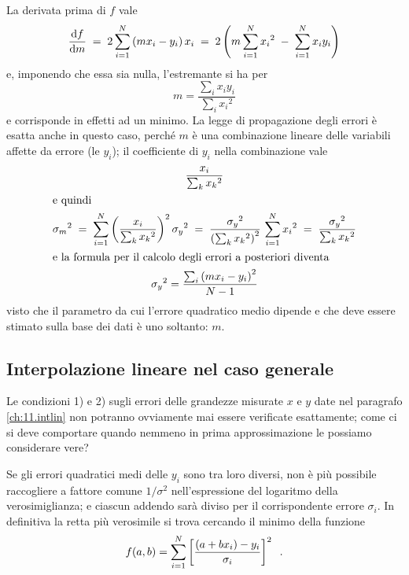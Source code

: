 La derivata prima di $f$ vale
\begin{equation*}
  \frac{\mathrm{d} f}{\mathrm{d} m} \; = \;
  2 \sum_{i=1}^N \left( m x_i - y_i \right) x_i
  \; = \; 2 \left( m \sum_{i=1}^N {x_i}^2 \; - \;
    \sum_{i=1}^N x_i y_i \right)
\end{equation*}
e, imponendo che essa sia nulla, l'estremante si ha per
\begin{equation*}
  m = \frac{\sum_i x_i y_i}{\sum_i {x_i}^2}
\end{equation*}
e corrisponde in effetti ad un minimo.  La legge di
propagazione degli errori \`e esatta anche in questo caso,
perch\'e $m$ \`e una combinazione lineare delle variabili
affette da errore (le $y_i$); il coefficiente di $y_i$ nella
combinazione vale
\begin{gather*}
  \frac{x_i}{\sum_k {x_k}^2} \\
  \intertext{e quindi}
  {\sigma_m}^2 \; = \; \sum_{i=1}^N \left(
    \frac{x_i}{\sum_k {x_k}^2} \right)^2
    {\sigma_y}^2 \; = \; \frac{{\sigma_y}^2}{
    \left( \sum_k {x_k}^2 \right)^2 } \,
    \sum_{i=1}^N {x_i}^2 \; = \; \frac{{\sigma_y}^2}
    {\sum_k {x_k}^2} \\
  \intertext{e la formula per il calcolo degli
    errori a posteriori diventa}%
  \index{errore!a posteriori}
  {\sigma_y}^2 = \frac{\sum_i \left( m x_i - y_i \right)
    ^2}{N-1}
\end{gather*}
visto che il parametro da cui l'errore quadratico medio
dipende e che deve essere stimato sulla base dei dati \`e
uno soltanto: $m$.%

\subsection{Interpolazione lineare nel caso generale}%
Le condizioni 1) e 2) sugli errori delle grandezze misurate
$x$ e $y$ date nel paragrafo \ref{ch:11.intlin} non potranno
ovviamente mai essere verificate esattamente; come ci si
deve comportare quando nemmeno in prima approssimazione le
possiamo considerare vere?

Se gli errori quadratici medi delle $y_i$ sono tra loro
diversi, non \`e pi\`u possibile raccogliere a fattore
comune $1 / \sigma^2$ nell'espressione del logaritmo della
verosimiglianza; e ciascun addendo sar\`a diviso per il
corrispondente errore $\sigma_i$.  In definitiva la retta
pi\`u verosimile si trova cercando il minimo della funzione
\begin{equation*}
  f(a,b) = \sum_{i=1}^N \left[
    \frac{ ( a + b x_i ) - y_i }{ \sigma_i } \right] ^2 \;\; .
\end{equation*}

